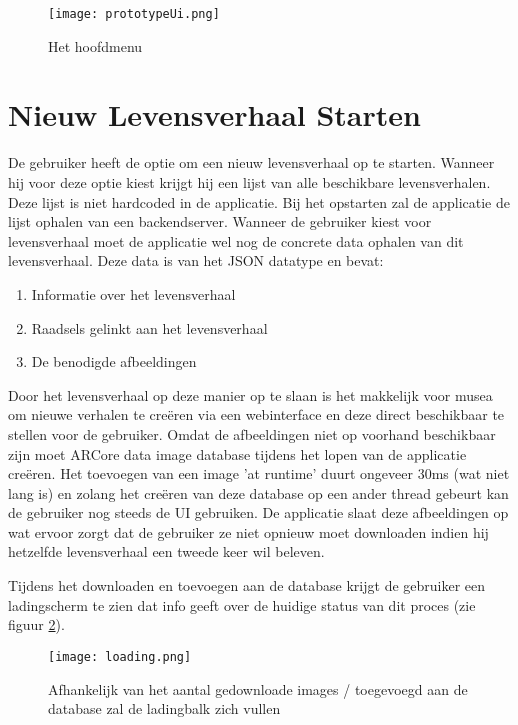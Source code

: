 \begin{figure}
    \texttt{[image: prototypeUi.png]}
    \caption{Het hoofdmenu}
    \label{fig:prototypeUi}
\end{figure}

\section{Nieuw Levensverhaal Starten}
De gebruiker heeft de optie om een nieuw levensverhaal op te starten. Wanneer hij voor deze optie kiest krijgt hij een lijst van alle beschikbare levensverhalen. Deze lijst is niet hardcoded in de applicatie. Bij het opstarten zal de applicatie de lijst ophalen van een backendserver. Wanneer de gebruiker kiest voor levensverhaal moet de applicatie wel nog de concrete data ophalen van dit levensverhaal. Deze data is van het JSON datatype en bevat:

\begin{enumerate}
    \item Informatie over het levensverhaal
    \item Raadsels gelinkt aan het levensverhaal
    \item De benodigde afbeeldingen
\end{enumerate}

Door het levensverhaal op deze manier op te slaan is het makkelijk voor musea om nieuwe verhalen te creëren via een webinterface en deze direct beschikbaar te stellen voor de gebruiker. Omdat de afbeeldingen niet op voorhand beschikbaar zijn moet ARCore data image database tijdens het lopen van de applicatie creëren. Het toevoegen van een image 'at runtime' duurt ongeveer 30ms (wat niet lang is) en zolang het creëren van deze database op een ander thread gebeurt kan de gebruiker nog steeds de UI gebruiken. De applicatie slaat deze afbeeldingen op wat ervoor zorgt dat de gebruiker ze niet opnieuw moet downloaden indien hij hetzelfde levensverhaal een tweede keer wil beleven. 

Tijdens het downloaden en toevoegen aan de database krijgt de gebruiker een ladingscherm te zien dat info geeft over de huidige status van dit proces (zie figuur \ref{fig:loading}).
\begin{figure}
    \texttt{[image: loading.png]}
    \caption{Afhankelijk van het aantal gedownloade images / toegevoegd aan de database zal de ladingbalk zich vullen}
    \label{fig:loading}
\end{figure}

